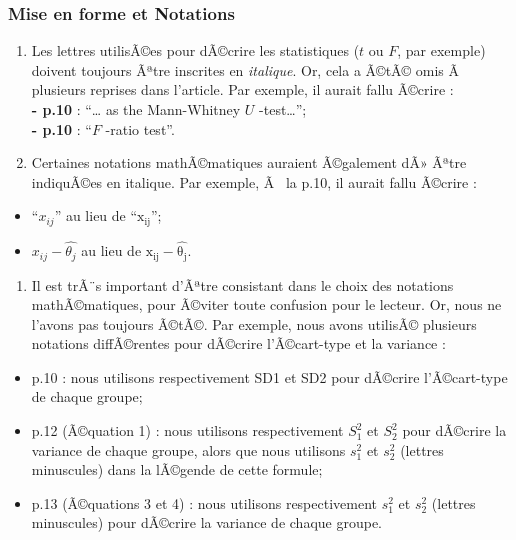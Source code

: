 \begin{appendix}
\hypertarget{mise-en-forme-et-notations}{%
\subsubsection{Mise en forme et
Notations}\label{mise-en-forme-et-notations}}

\begin{enumerate}
\def\labelenumi{\arabic{enumi})}
\item
  Les lettres utilisÃ©es pour dÃ©crire les statistiques (\(t\) ou \(F\),
  par exemple) doivent toujours Ãªtre inscrites en \emph{italique}. Or,
  cela a Ã©tÃ© omis Ã~ plusieurs reprises dans l'article. Par exemple,
  il aurait fallu Ã©crire :\\
  \textbf{- p.10} : ``\ldots{} as the Mann-Whitney \color{blue}\(U\)
  \color{black}-test\ldots{}'';\\
  \textbf{- p.10} : ``\color{blue}\(F\) \color{black}-ratio test''.
\item
  Certaines notations mathÃ©matiques auraient Ã©galement dÃ» Ãªtre
  indiquÃ©es en italique. Par exemple, Ã~ la p.10, il aurait fallu
  Ã©crire :\\
\end{enumerate}

\begin{itemize}
\tightlist
\item
  ``\(x_{ij}\)'' au lieu de ``\(\mathrm{x_{ij}}\)'';\\
\item
  \textbar{}\(x_{ij}-\hat{\theta_j}\)\textbar{} au lieu de
  \textbar{}\(\mathrm{x_{ij}-\hat{\theta_j}}\)\textbar.
\end{itemize}

\begin{enumerate}
\def\labelenumi{\arabic{enumi})}
\setcounter{enumi}{2}
\tightlist
\item
  Il est trÃ¨s important d'Ãªtre consistant dans le choix des notations
  mathÃ©matiques, pour Ã©viter toute confusion pour le lecteur. Or, nous
  ne l'avons pas toujours Ã©tÃ©. Par exemple, nous avons utilisÃ©
  plusieurs notations diffÃ©rentes pour dÃ©crire l'Ã©cart-type et la
  variance :\\
\end{enumerate}

\begin{itemize}
\tightlist
\item
  p.10 : nous utilisons respectivement SD1 et SD2 pour dÃ©crire
  l'Ã©cart-type de chaque groupe;\\
\item
  p.12 (Ã©quation 1) : nous utilisons respectivement \(S^2_1\) et
  \(S^2_2\) pour dÃ©crire la variance de chaque groupe, alors que nous
  utilisons \(s^2_1\) et \(s^2_2\) (lettres minuscules) dans la lÃ©gende
  de cette formule;\\
\item
  p.13 (Ã©quations 3 et 4) : nous utilisons respectivement \(s^2_1\) et
  \(s^2_2\) (lettres minuscules) pour dÃ©crire la variance de chaque
  groupe.
\end{itemize}


\end{appendix}
